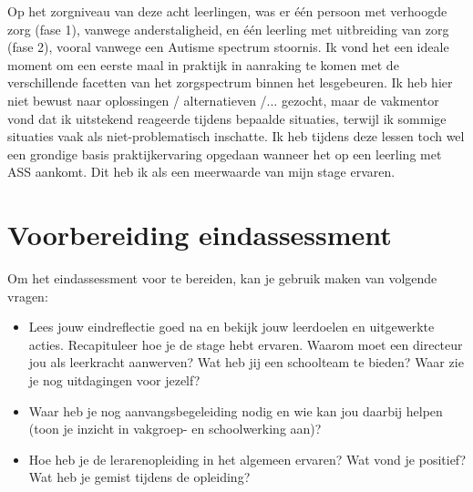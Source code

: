 \documentclass[a4paper,12pt,twoside]{article}%
\begin{document}
Op het zorgniveau van deze acht leerlingen, was er één persoon met verhoogde zorg (fase 1), vanwege anderstaligheid, en één leerling met uitbreiding van zorg (fase 2), vooral vanwege een Autisme spectrum stoornis. Ik vond het een ideale moment om een eerste maal in praktijk in aanraking te komen met de verschillende facetten van het zorgspectrum binnen het lesgebeuren. Ik heb hier niet bewust naar oplossingen / alternatieven /... gezocht, maar de vakmentor vond dat ik uitstekend reageerde tijdens bepaalde situaties, terwijl ik sommige situaties vaak als niet-problematisch inschatte. Ik heb tijdens deze lessen toch wel een grondige basis praktijkervaring opgedaan wanneer het op een leerling met ASS aankomt. Dit heb ik als een meerwaarde van mijn stage ervaren. \newline
\newline












\newpage
\section{Voorbereiding eindassessment}

Om het eindassessment voor te bereiden, kan je gebruik maken van volgende vragen:
\begin{itemize}
	\item Lees jouw eindreflectie goed na en bekijk jouw leerdoelen en uitgewerkte acties. Recapituleer hoe je de stage hebt ervaren. Waarom moet een directeur jou als leerkracht aanwerven? Wat heb jij een schoolteam te bieden? Waar zie je nog uitdagingen voor jezelf? 
	\item Waar heb je nog aanvangsbegeleiding nodig en wie kan jou daarbij helpen (toon je inzicht in vakgroep- en schoolwerking aan)?
	\item Hoe heb je de lerarenopleiding in het algemeen ervaren? Wat vond je positief? Wat heb je gemist tijdens de opleiding?
\end{itemize} 







	
	
	
\end{document}

